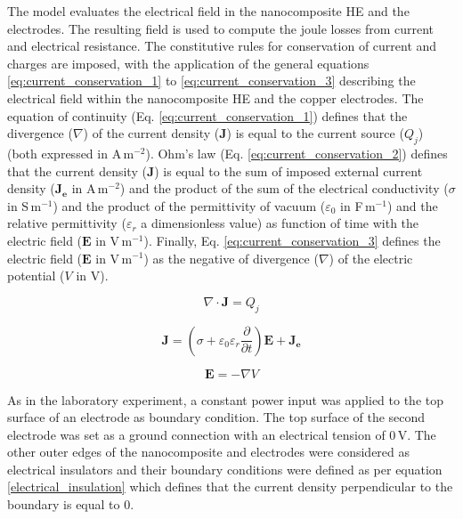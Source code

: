 The model evaluates the electrical field in the nanocomposite HE and the electrodes. 
The resulting field is used to compute the joule losses from current and electrical resistance. 
The constitutive rules for conservation of current and charges are imposed, with the application of the general equations \ref{eq:current_conservation_1} to \ref{eq:current_conservation_3} describing the electrical field within the nanocomposite HE and the copper electrodes. 
The equation of continuity (Eq. \ref{eq:current_conservation_1}) defines that the divergence ($\nabla$) of the current density ($\mathbf{J}$) is equal to the current source ($Q_j$) (both expressed in \mbox{A\,m$^{-2}$}). 
Ohm’s law (Eq. \ref{eq:current_conservation_2}) defines that the current density ($\mathbf{J}$) is equal to the sum of imposed external current density ($\mathbf{J_e}$ in \mbox{A\,m$^{-2}$}) and the product of the sum of the electrical conductivity ($\sigma$ in \mbox{S\,m$^{-1}$}) and the product of the permittivity of vacuum ($\varepsilon_0$ in \mbox{F\,m$^{-1}$}) and the relative permittivity ($\varepsilon_r$ a dimensionless value) as function of time with the electric field ($\mathbf{E}$ in \mbox{V\,m$^{-1}$}). 
Finally, Eq. \ref{eq:current_conservation_3} defines the electric field ($\mathbf{E}$ in \mbox{V\,m$^{-1}$}) as the negative of divergence ($\nabla$) of the electric potential ($V$ in V). 

\begin{equation}
\nabla \cdot \mathbf{J} = Q_j
\label{eq:current_conservation_1}
\end{equation}

\begin{equation}
\mathbf{J} = \left( \sigma + \varepsilon_0 \varepsilon_r \frac{\partial}{\partial t} \right) \mathbf{E} + \mathbf{J_e}
\label{eq:current_conservation_2}
\end{equation}

\begin{equation}
\mathbf{E} = - \nabla V
\label{eq:current_conservation_3}
\end{equation}

As in the laboratory experiment, a constant power input was applied to the top surface of an electrode as boundary condition. 
The top surface of the second electrode was set as a ground connection with an electrical tension of 0\,V. 
The other outer edges of the nanocomposite and electrodes were considered as electrical insulators and their boundary conditions were defined as per equation \ref{electrical_insulation} which defines that the current density perpendicular to the boundary is equal to 0. 

